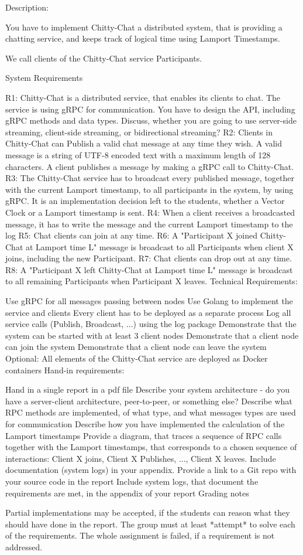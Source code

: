 Description:

You have to implement Chitty-Chat a distributed system, that is providing a chatting service, and keeps track of logical time using Lamport Timestamps.

We call clients of the Chitty-Chat service Participants. 

System Requirements

R1: Chitty-Chat is a distributed service, that enables its clients to chat. The service is using gRPC for communication. You have to design the API, including gRPC methods and data types.  Discuss, whether you are going to use server-side streaming, client-side streaming, or bidirectional streaming?
R2: Clients in Chitty-Chat can Publish a valid chat message at any time they wish.  A valid message is a string of UTF-8 encoded text with a maximum length of 128 characters. A client publishes a message by making a gRPC call to Chitty-Chat.
R3: The Chitty-Chat service has to broadcast every published message, together with the current Lamport timestamp, to all participants in the system, by using gRPC. It is an implementation decision left to the students, whether a Vector Clock or a Lamport timestamp is sent.
R4: When a client receives a broadcasted message, it has to write the message and the current Lamport timestamp to the log
R5: Chat clients can join at any time. 
R6: A "Participant X  joined Chitty-Chat at Lamport time L" message is broadcast to all Participants when client X joins, including the new Participant.
R7: Chat clients can drop out at any time. 
R8: A "Participant X left Chitty-Chat at Lamport time L" message is broadcast to all remaining Participants when Participant X leaves.
Technical Requirements:

Use gRPC for all messages passing between nodes
Use Golang to implement the service and clients
Every client has to be deployed as a separate process
Log all service calls (Publish, Broadcast, ...) using the log package
Demonstrate that the system can be started with at least 3 client nodes 
Demonstrate that a client node can join the system
Demonstrate that a client node can leave the system
Optional: All elements of the Chitty-Chat service are deployed as Docker containers
Hand-in requirements:

Hand in a single report in a pdf file
Describe your system architecture - do you have a server-client architecture, peer-to-peer, or something else?
Describe what  RPC methods are implemented, of what type, and what messages types are used for communication
Describe how you have implemented the calculation of the Lamport timestamps
Provide a diagram, that traces a sequence of RPC calls together with the Lamport timestamps, that corresponds to a chosen sequence of interactions: Client X joins, Client X Publishes, ..., Client X leaves. Include documentation (system logs) in your appendix.
Provide a link to a Git repo with your source code in the report
Include system logs, that document the requirements are met, in the appendix of your report
Grading notes

Partial implementations may be accepted, if the students can reason what they should have done in the report.
The group must at least *attempt* to solve each of the requirements. The whole assignment is failed, if a requirement is not addressed.
